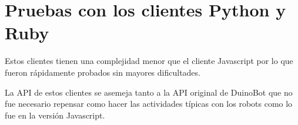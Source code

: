 \section{Pruebas con los clientes Python y Ruby}
Estos clientes tienen una complejidad menor que el cliente Javascript
por lo que fueron rápidamente probados sin mayores dificultades.

La API de estos clientes se asemeja tanto a la API original de
DuinoBot que no fue necesario repensar como hacer las actividades
típicas con los robots como lo fue en la versión Javascript.
